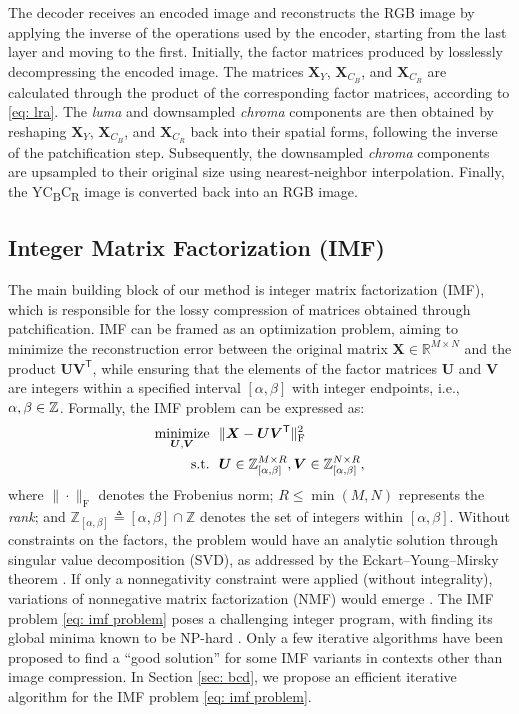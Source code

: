 The decoder receives an encoded image and reconstructs the RGB image by applying the inverse of the operations used by the encoder, starting from the last layer and moving to the first. Initially, the factor matrices produced by losslessly decompressing the encoded image. The matrices $\bm{X}_{Y}$, $\bm{X}_{C_B}$, and $\bm{X}_{C_R}$ are calculated through the product of the corresponding factor matrices, according to \eqref{eq: lra}. The \emph{luma} and downsampled \emph{chroma} components are then obtained by reshaping $\bm{X}_{Y}$, $\bm{X}_{C_B}$, and $\bm{X}_{C_R}$ back into their spatial forms, following the inverse of the patchification step. Subsequently, the downsampled \emph{chroma} components are upsampled to their original size using nearest-neighbor interpolation. Finally, the YC\textsubscript{B}C\textsubscript{R} image is converted back into an RGB image. 


\subsection{Integer Matrix Factorization (IMF)} \label{sec: imf}

The main building block of our method is integer matrix factorization (IMF), which is responsible for the lossy compression of matrices obtained through patchification. IMF can be framed as an optimization problem, aiming to minimize the reconstruction error between the original matrix $\bm{X} \in \mathbb{R}^{M \times N}$ and the product $\bm{U} \bm{V}^\mathsf{T}$, while ensuring that the elements of the factor matrices $\bm{U}$ and $\bm{V}$ are integers within a specified interval $[\alpha,\beta]$ with integer endpoints, i.e., $\alpha,\beta\in\mathbb Z$. Formally, the IMF problem can be expressed as:
\begin{align} \label{eq: imf problem}
	\operatorname*{minimize}_{\bm{U}, \bm{V}} & \ \  \| \bm{X} - \bm{U} \bm{V}^\mathsf{T} \|_\text{F}^2 \nonumber \\
	\text{s.t.}           & \ \ \bm{U} \in \mathbb{Z}_{[\alpha,\beta]}^{M \times R}, \bm{V} \in \mathbb{Z}_{[\alpha,\beta]}^{N \times R},
\end{align}
where $\|\cdot\|_\text{F}$ denotes the Frobenius norm; $R \leq \min(M,N)$ represents the \emph{rank}; and $\mathbb{Z}_{[\alpha,\beta]} \triangleq [\alpha,\beta] \cap \mathbb{Z}$ denotes the set of integers within $[\alpha,\beta]$. Without constraints on the factors, the problem would have an analytic solution through singular value decomposition (SVD), as addressed by the Eckart–Young–Mirsky theorem \cite{eckart1936approximation}. If only a nonnegativity constraint were applied (without integrality), variations of nonnegative matrix factorization (NMF) would emerge \cite{lee2000algorithms, gillis2020nonnegative}. The IMF problem \eqref{eq: imf problem} poses a challenging integer program, with finding its global minima known to be NP-hard \cite{dong2018integer, van1981another}. Only a few iterative algorithms \cite{dong2018integer, lin2005integer} have been proposed to find a ``good solution'' for some IMF variants in contexts other than image compression. In Section \ref{sec: bcd}, we propose an efficient iterative algorithm for the IMF problem \eqref{eq: imf problem}.


